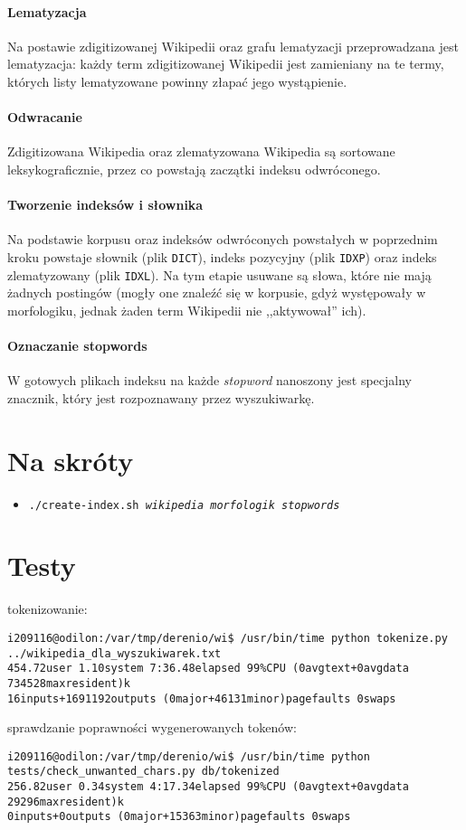 \documentclass[a4paper,12pt]{article}
\begin{document}
\paragraph{Lematyzacja} Na postawie zdigitizowanej Wikipedii oraz grafu
lematyzacji przeprowadzana jest lematyzacja: każdy term zdigitizowanej
Wikipedii jest zamieniany na te termy, których listy lematyzowane powinny
złapać jego wystąpienie.

\paragraph{Odwracanie} Zdigitizowana Wikipedia oraz zlematyzowana Wikipedia
są sortowane leksykograficznie, przez co powstają zaczątki indeksu odwróconego.

\paragraph{Tworzenie indeksów i słownika} Na podstawie korpusu oraz indeksów
odwróconych powstałych w poprzednim kroku powstaje słownik (plik
\texttt{DICT}), indeks pozycyjny (plik \texttt{IDXP}) oraz indeks zlematyzowany
(plik \texttt{IDXL}). Na tym etapie usuwane są słowa, które nie mają żadnych
postingów (mogły one znaleźć się w korpusie, gdyż występowały w morfologiku,
jednak żaden term Wikipedii nie ,,aktywował'' ich).

\paragraph{Oznaczanie stopwords} W gotowych plikach indeksu na każde
\textit{stopword} nanoszony jest specjalny znacznik, który jest rozpoznawany
przez wyszukiwarkę.
\newpage

\section{Na skróty}
\begin{itemize}
	\item \texttt{./create-index.sh \textit{wikipedia morfologik stopwords}}
\end{itemize}

\newpage

\section{Testy}

tokenizowanie:
\begin{verbatim}
i209116@odilon:/var/tmp/derenio/wi$ /usr/bin/time python tokenize.py ../wikipedia_dla_wyszukiwarek.txt
454.72user 1.10system 7:36.48elapsed 99%CPU (0avgtext+0avgdata 734528maxresident)k
16inputs+1691192outputs (0major+46131minor)pagefaults 0swaps
\end{verbatim}

sprawdzanie poprawności wygenerowanych tokenów:
\begin{verbatim}
i209116@odilon:/var/tmp/derenio/wi$ /usr/bin/time python tests/check_unwanted_chars.py db/tokenized
256.82user 0.34system 4:17.34elapsed 99%CPU (0avgtext+0avgdata 29296maxresident)k
0inputs+0outputs (0major+15363minor)pagefaults 0swaps
\end{verbatim}
\end{document}
